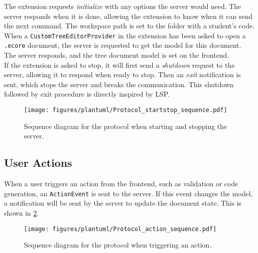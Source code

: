 The extension requests \textit{initialize} with any options the server would need.
The server responds when it is done, allowing the extension to know when it can send the next command.
The workspace path is set to the folder with a student's code.\\

When a \texttt{CustomTreeEditorProvider} in the extension has been asked to open a \texttt{.ecore} document, the server is requested to get the model for this document.
The server responds, and the tree document model is set on the frontend.\\

If the extension is asked to stop, it will first send a \textit{shutdown} request to the server, allowing it to respond when ready to stop.
Then an \textit{exit} notification is sent, which stops the server and breaks the communication.
This shutdown followed by exit procedure is directly inspired by \acrshort{LSP}.


\begin{figure}[htbp]  %
  \centering
  \texttt{[image: figures/plantuml/Protocol\_startstop\_sequence.pdf]}
  \caption[Protocol Sequence Diagram of Start/Stop and Document Opening]{Sequence diagram for the protocol when starting and stopping the server. \bluearrowDesc}\label{fig:protocol-startstop}
\end{figure}

\FloatBarrier

\subsection{User Actions}

When a user triggers an action from the frontend, such as validation or code generation, an \texttt{ActionEvent} is sent to the server.
If this event changes the model, a notification will be sent by the server to update the document state.
This is shown in \cref{fig:protocol-action}.

\begin{figure}[htbp]  %
  \centering
  \texttt{[image: figures/plantuml/Protocol\_action\_sequence.pdf]}
  \caption[Protocol Sequence Diagram of Action Triggering]{Sequence diagram for the protocol when triggering an action. \bluearrowDesc}\label{fig:protocol-action}
\end{figure}

\FloatBarrier


